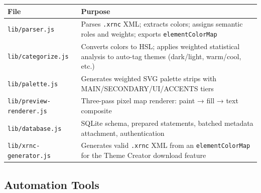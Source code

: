 \documentclass[
  11pt,
  oneside]{report}
\begin{document}
\begin{longtable}[]{@{}
  >{\raggedright\arraybackslash}p{}
  >{\raggedright\arraybackslash}p{}@{}}
\toprule\noalign{}
\begin{minipage}[b]{\linewidth}\raggedright
File
\end{minipage} & \begin{minipage}[b]{\linewidth}\raggedright
Purpose
\end{minipage} \\
\midrule\noalign{}
\endhead
\bottomrule\noalign{}
\endlastfoot
\texttt{lib/parser.js} & Parses \texttt{.xrnc} XML; extracts colors;
assigns semantic roles and weights; exports \texttt{elementColorMap} \\
\texttt{lib/categorize.js} & Converts colors to HSL; applies weighted
statistical analysis to auto-tag themes (dark/light, warm/cool, etc.) \\
\texttt{lib/palette.js} & Generates weighted SVG palette strips with
MAIN/SECONDARY/UI/ACCENTS tiers \\
\texttt{lib/preview-renderer.js} & Three-pass pixel map renderer: paint
→ fill → text composite \\
\texttt{lib/database.js} & SQLite schema, prepared statements, batched
metadata attachment, authentication \\
\texttt{lib/xrnc-generator.js} & Generates valid \texttt{.xrnc} XML from
an \texttt{elementColorMap} for the Theme Creator download feature \\
\end{longtable}

\subsection{Automation Tools}\label{automation-tools}
\end{document}
